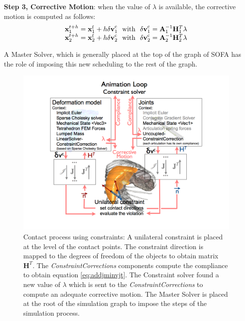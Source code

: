 \textbf{Step 3, Corrective Motion}: when the value of $\lambda$ is available, the corrective motion is computed as follows:
%
\begin{equation}
\label{eq:corrective-motion}
\begin{array}{c}
\mathbf{x }_{1}^{t+h} =  \mathbf{x }_{1}^{\mathrm{f}} + h \mathbf{\delta\mathbf{v } }_1^{\mathrm{c}} \  \  \mathrm{ with } \  \  \mathbf{\delta\mathbf{v } }_1^{\mathrm{c}} = \mathbf{A}_1^{-1}  \mathbf{H}_1^T \lambda \\
\mathbf{x }_{2}^{t+h} =  \mathbf{x }_{2}^{\mathrm{f}} + h \mathbf{\delta\mathbf{v } }_2^{\mathrm{c}} \  \  \mathrm{ with } \  \  \mathbf{\delta\mathbf{v } }_2^{\mathrm{c}} = \mathbf{A}_2^{-1}  \mathbf{H}_2^T \lambda
\end{array}
\end{equation}
%

A Master Solver, which is generally placed at the top of the graph of SOFA has the role of imposing this new scheduling to the rest of the graph. 
%
\begin{figure}[!htb]
\centering
\includegraphics[width= 0.9\columnwidth]{ConstraintSolver.png}
\caption{Contact process using constraints: A unilateral constraint is placed at the level of the contact points. The constraint direction is mapped to the degrees of freedom of the objects to obtain matrix $ \mathbf{H}^T$. The \textit{ConstraintCorrections} components compute the compliance to obtain equation \ref{eq:addjminvjt}. The Constraint solver found a new value of $\lambda$ which is sent to the  \textit{ConstraintCorrections} to compute an adequate corrective motion. The Master Solver is placed at the root of the simulation graph to impose the steps of the simulation process.  }
\label{shema_ToH}
\end{figure}


